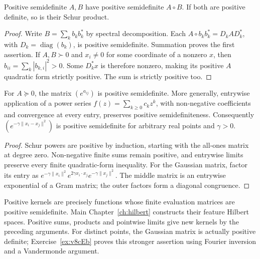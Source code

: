 \begin{theorem}[Schur, 1911]\label{linear:thm:schurproduct}
Positive semidefinite $A,B$ have positive semidefinite $A\circ B$. If both are positive definite, so is their Schur product.
\end{theorem}
\begin{proof}
Write $B=\sum_kb_kb_k^*$ by spectral decomposition. Each $A\circ b_kb_k^*=D_kAD_k^*$, with $D_k=\operatorname{diag}(b_k)$, is positive semidefinite. Summation proves the first assertion. If $A,B\succ0$ and $x_i\ne0$ for some coordinate of a nonzero $x$, then $b_{ii}=\sum_k|b_{k,i}|^2>0$. Some $D_k^*x$ is therefore nonzero, making its positive $A$ quadratic form strictly positive. The sum is strictly positive too.
\end{proof}

\begin{corollary}\label{linear:cor:entrywiseexp}
For $A\succeq0$, the matrix $(e^{a_{ij}})$ is positive semidefinite. More generally, entrywise application of a power series $f(z)=\sum_{k\ge0}c_kz^k$, with non-negative coefficients and convergence at every entry, preserves positive semidefiniteness. Consequently $(e^{-\gamma\|x_i-x_j\|^2})$ is positive semidefinite for arbitrary real points and $\gamma>0$.
\end{corollary}
\begin{proof}
Schur powers are positive by induction, starting with the all-ones matrix at degree zero. Non-negative finite sums remain positive, and entrywise limits preserve every finite quadratic-form inequality. For the Gaussian matrix, factor its entry as $e^{-\gamma\|x_i\|^2}e^{2\gamma x_i\cdot x_j}e^{-\gamma\|x_j\|^2}$. The middle matrix is an entrywise exponential of a Gram matrix; the outer factors form a diagonal congruence.
\end{proof}

Positive kernels are precisely functions whose finite evaluation matrices are positive semidefinite. Main Chapter~\ref{ch:hilbert} constructs their feature Hilbert spaces. Positive sums, products and pointwise limits give new kernels by the preceding arguments. For distinct points, the Gaussian matrix is actually positive definite; Exercise~\ref{ex:v8cEb} proves this stronger assertion using Fourier inversion and a Vandermonde argument.

